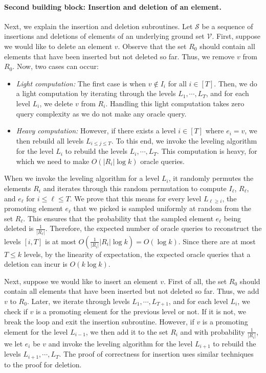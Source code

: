\documentclass[11pt]{article}
\newcommand{\ground}{\ensuremath{\mathcal{V}}}
\begin{document}
\paragraph{Second building block: Insertion and deletion of an element.}
Next, we explain the insertion and deletion subroutines. 
Let $\mathcal{S}$ be a sequence of insertions and deletions of elements of an underlying ground set $\ground$.
First, suppose we would like to delete an element $v$.
Observe that the set $R_0$ should contain all elements that have been inserted but not deleted so far. 
Thus, we remove $v$ from $R_0$. 
Now, two cases can occur:
\begin{itemize}
    \item \emph{Light computation:} 
        The first case is when $v \notin I_i$ for all $i \in [T]$. 
        Then, we do a light computation by   
        iterating through the levels $L_1,\cdots, L_T$, and 
        for each level $L_i$, we delete $v$ from $R_i$. 
        Handling this light computation takes zero query complexity as we do not make any oracle query. 
    \item \emph{Heavy computation:}
       However, if there exists a level $i \in [T]$ where $e_i = v$, we then  
       rebuild all levels $L_{i \le j \le T}$. To this end, we invoke the leveling algorithm 
       for the level $L_i$ to rebuild the levels $L_{i},\cdots, L_T$. 
       This computation is heavy, for which we need to make $O(|R_i|  \log k)$ oracle queries. 
\end{itemize}

When we invoke the leveling algorithm for a level $L_i$, 
it randomly permutes the elements $R_i$ and iterates through this random permutation 
to compute $I_{\ell}$, $R_{\ell}$, and $e_{\ell}$ for $i \le \ell \le T$. 
We prove that this means for every level $L_{\ell \ge i}$, the promoting element $e_{\ell}$ that we picked is sampled uniformly at random from the set $R_{\ell}$. 
This ensures that the probability that the sampled element $e_{\ell}$ being deleted is $\frac{1}{|R_{\ell}|}$.
Therefore, the expected number of oracle queries to reconstruct the levels $[i,T]$ is at most $ O( \frac{1}{|R_i|}  |R_i|  \log k) = O(\log k)$.
Since there are at most $T \le k$ levels, by the linearity of expectation, 
the expected oracle queries that a deletion can incur is $O(k\log k)$.



Next, suppose we would like to insert an element $v$. 
First of all, the set $R_0$ should contain all elements that have been inserted but not deleted so far. 
Thus, we add $v$ to $R_0$. 
Later, we iterate through levels $L_1,\cdots,L_{T+1}$, and 
for each level $L_i$, we check if $v$ is a promoting element for the previous level or not. 
If it is not, we break the loop and exit the insertion subroutine. 
However, if $v$ is a promoting element for the level $L_{i-1}$, 
we then add it to the set $R_i$ and with probability $\frac{1}{|R_i|}$, 
we let $e_i$  be $v$  and invoke the leveling algorithm 
for the level $L_{i+1}$ to rebuild the levels $L_{i+1},\cdots, L_T$. 
The proof of correctness for insertion uses similar techniques to the proof for deletion.
\end{document}
